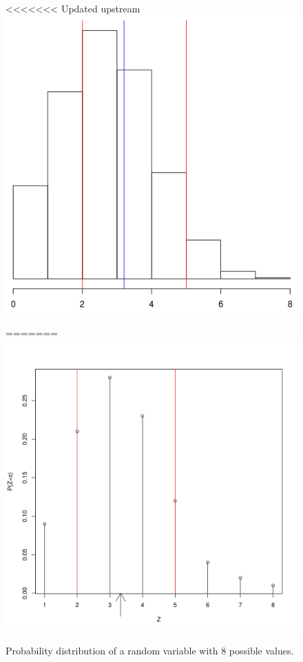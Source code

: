 \documentclass[a4paper,11pt,leqno]{report}
\begin{document}
\begin{figure}
\center
<<<<<<< Updated upstream
\includegraphics[scale=.3]{histogram.png}
\caption{Probability distribution of a random variable with $ 8 $ possible values.}
=======
\includegraphics[scale=.4]{distribution.png}

\end{figure}
\end{document}
